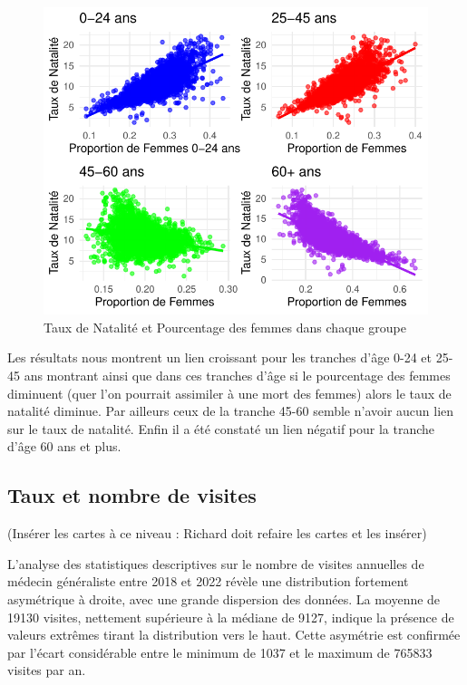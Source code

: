 \documentclass[
]{article}
\begin{document}
\begin{figure}

{\centering \includegraphics{rapport_intermediaire_files/figure-latex/unnamed-chunk-18-1} 

}

\caption{Taux de Natalité et Pourcentage des femmes dans chaque groupe}\label{fig:unnamed-chunk-18}
\end{figure}

Les résultats nous montrent un lien croissant pour les tranches d'âge
0-24 et 25-45 ans montrant ainsi que dans ces tranches d'âge si le
pourcentage des femmes diminuent (quer l'on pourrait assimiler à une
mort des femmes) alors le taux de natalité diminue. Par ailleurs ceux de
la tranche 45-60 semble n'avoir aucun lien sur le taux de natalité.
Enfin il a été constaté un lien négatif pour la tranche d'âge 60 ans et
plus.

\hypertarget{taux-et-nombre-de-visites}{%
\subsection{Taux et nombre de visites}\label{taux-et-nombre-de-visites}}

(Insérer les cartes à ce niveau : Richard doit refaire les cartes et les
insérer)

L'analyse des statistiques descriptives sur le nombre de visites
annuelles de médecin généraliste entre 2018 et 2022 révèle une
distribution fortement asymétrique à droite, avec une grande dispersion
des données. La moyenne de 19130 visites, nettement supérieure à la
médiane de 9127, indique la présence de valeurs extrêmes tirant la
distribution vers le haut. Cette asymétrie est confirmée par l'écart
considérable entre le minimum de 1037 et le maximum de 765833 visites
par an.
\end{document}
